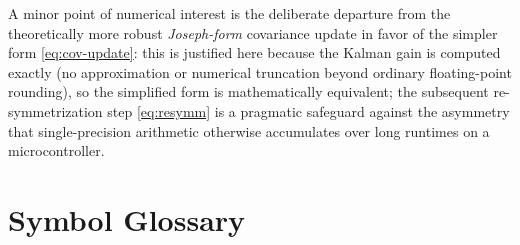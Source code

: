 \documentclass[11pt]{article}
\begin{document}
A minor point of numerical interest is the deliberate departure from the theoretically more robust \emph{Joseph-form} covariance update in favor of the simpler form \eqref{eq:cov-update}: this is justified here because the Kalman gain is computed exactly (no approximation or numerical truncation beyond ordinary floating-point rounding), so the simplified form is mathematically equivalent; the subsequent re-symmetrization step \eqref{eq:resymm} is a pragmatic safeguard against the asymmetry that single-precision arithmetic otherwise accumulates over long runtimes on a microcontroller.

\section*{Symbol Glossary}
\end{document}
